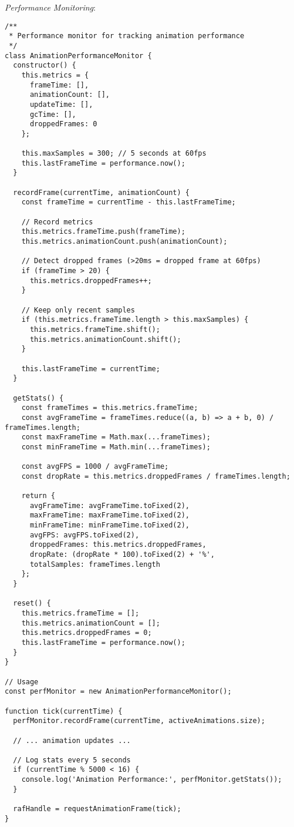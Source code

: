 \documentclass[11pt]{article}
\begin{document}
\emph{Performance Monitoring}:

\begin{verbatim}
/**
 * Performance monitor for tracking animation performance
 */
class AnimationPerformanceMonitor {
  constructor() {
    this.metrics = {
      frameTime: [],
      animationCount: [],
      updateTime: [],
      gcTime: [],
      droppedFrames: 0
    };
    
    this.maxSamples = 300; // 5 seconds at 60fps
    this.lastFrameTime = performance.now();
  }
  
  recordFrame(currentTime, animationCount) {
    const frameTime = currentTime - this.lastFrameTime;
    
    // Record metrics
    this.metrics.frameTime.push(frameTime);
    this.metrics.animationCount.push(animationCount);
    
    // Detect dropped frames (>20ms = dropped frame at 60fps)
    if (frameTime > 20) {
      this.metrics.droppedFrames++;
    }
    
    // Keep only recent samples
    if (this.metrics.frameTime.length > this.maxSamples) {
      this.metrics.frameTime.shift();
      this.metrics.animationCount.shift();
    }
    
    this.lastFrameTime = currentTime;
  }
  
  getStats() {
    const frameTimes = this.metrics.frameTime;
    const avgFrameTime = frameTimes.reduce((a, b) => a + b, 0) / frameTimes.length;
    const maxFrameTime = Math.max(...frameTimes);
    const minFrameTime = Math.min(...frameTimes);
    
    const avgFPS = 1000 / avgFrameTime;
    const dropRate = this.metrics.droppedFrames / frameTimes.length;
    
    return {
      avgFrameTime: avgFrameTime.toFixed(2),
      maxFrameTime: maxFrameTime.toFixed(2),
      minFrameTime: minFrameTime.toFixed(2),
      avgFPS: avgFPS.toFixed(2),
      droppedFrames: this.metrics.droppedFrames,
      dropRate: (dropRate * 100).toFixed(2) + '%',
      totalSamples: frameTimes.length
    };
  }
  
  reset() {
    this.metrics.frameTime = [];
    this.metrics.animationCount = [];
    this.metrics.droppedFrames = 0;
    this.lastFrameTime = performance.now();
  }
}

// Usage
const perfMonitor = new AnimationPerformanceMonitor();

function tick(currentTime) {
  perfMonitor.recordFrame(currentTime, activeAnimations.size);
  
  // ... animation updates ...
  
  // Log stats every 5 seconds
  if (currentTime % 5000 < 16) {
    console.log('Animation Performance:', perfMonitor.getStats());
  }
  
  rafHandle = requestAnimationFrame(tick);
}
\end{verbatim}
\end{document}
